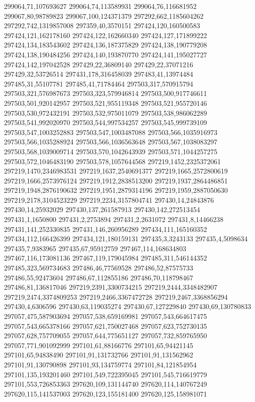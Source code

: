 299064,71,107693627
299064,74,113589931
299064,76,116681952
299067,80,98789823
299067,100,124371379
297292,662,1185604262
297292,742,1319857008
297359,40,3570151
297424,120,160500583
297424,121,162178160
297424,122,162660340
297424,127,171899222
297424,134,183543602
297424,136,187375829
297424,138,190779208
297424,138,190484256
297424,140,193870770
297424,141,195027727
297424,142,197042528
297429,22,36809140
297429,22,37071216
297429,32,53726514
297431,178,316458039
297483,41,13974484
297485,31,55107781
297485,41,71784464
297503,317,570915794
297503,321,576987673
297503,323,579946814
297503,500,917746611
297503,501,920142957
297503,521,955119348
297503,521,955720146
297503,530,972432191
297503,532,975011079
297503,538,986062289
297503,541,992020970
297503,544,997534257
297503,545,999739109
297503,547,1003252883
297503,547,1003487088
297503,566,1035916973
297503,566,1035288924
297503,566,1036563648
297503,567,1038083297
297503,568,1039009714
297503,570,1042643939
297503,571,1044257275
297503,572,1046483190
297503,578,1057644568
297219,1452,2325372061
297219,1470,2346983531
297219,1637,2540691377
297219,1665,2572800619
297219,1666,2573976124
297219,1912,2838513200
297219,1937,2864486851
297219,1948,2876190632
297219,1951,2879314196
297219,1959,2887050630
297219,2178,3104523229
297219,2234,3157804741
297430,14,24843876
297430,14,25932029
297430,137,261587913
297430,142,272513454
297431,1,1650800
297431,2,2753894
297431,2,2631072
297431,8,14466238
297431,141,252330835
297431,146,260956289
297434,111,165160352
297434,112,166426399
297434,121,180159131
297435,3,3243133
297435,4,5098634
297435,7,9383965
297435,67,95912759
297467,114,168634803
297467,116,173081136
297467,119,179045984
297485,311,546144352
297485,323,569734683
297486,46,77569528
297486,52,87575733
297486,55,92473604
297486,67,112855186
297486,70,118798467
297486,81,136817046
297219,2391,3300734215
297219,2444,3348482907
297219,2474,3374809253
297219,2466,3367472728
297219,2467,3368856294
297430,4,6306596
297430,63,119035274
297430,67,127229840
297430,69,130780833
297057,475,587903694
297057,538,659169981
297057,543,664617475
297057,543,665378166
297057,621,750027468
297057,623,752730135
297057,628,757709055
297057,644,775651127
297057,732,859765950
297057,771,901092999
297101,61,88166776
297101,65,94421145
297101,65,94838490
297101,91,131732766
297101,91,131562962
297101,91,130790898
297101,93,134759774
297101,84,121854954
297101,135,193201460
297101,549,722395045
297101,545,716619779
297101,553,726853363
297620,109,131144740
297620,114,140767249
297620,115,141537003
297620,123,155181400
297620,125,158981071
